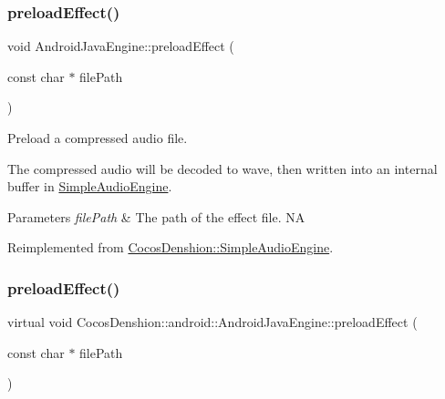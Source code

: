 \subsubsection{\texorpdfstring{preload\+Effect()}{preloadEffect()}\hspace{0.1cm}{\footnotesize\ttfamily [1/2]}}
{\footnotesize\ttfamily void Android\+Java\+Engine\+::preload\+Effect (\begin{DoxyParamCaption}\item[{const char $\ast$}]{file\+Path }\end{DoxyParamCaption})\hspace{0.3cm}{\ttfamily [virtual]}}

Preload a compressed audio file.

The compressed audio will be decoded to wave, then written into an internal buffer in \hyperlink{classCocosDenshion_1_1SimpleAudioEngine}{Simple\+Audio\+Engine}.


\begin{DoxyParams}{Parameters}
{\em file\+Path} & The path of the effect file.  NA \\
\hline
\end{DoxyParams}


Reimplemented from \hyperlink{classCocosDenshion_1_1SimpleAudioEngine_ab4c7a383c668003d48094a3ed867a778}{Cocos\+Denshion\+::\+Simple\+Audio\+Engine}.

\mbox{\label{classCocosDenshion_1_1android_1_1AndroidJavaEngine_aa863dece58028ea4877b1215a5a9bd7c}} 
\subsubsection{\texorpdfstring{preload\+Effect()}{preloadEffect()}\hspace{0.1cm}{\footnotesize\ttfamily [2/2]}}
{\footnotesize\ttfamily virtual void Cocos\+Denshion\+::android\+::\+Android\+Java\+Engine\+::preload\+Effect (\begin{DoxyParamCaption}\item[{const char $\ast$}]{file\+Path }\end{DoxyParamCaption})\hspace{0.3cm}{\ttfamily [virtual]}}

